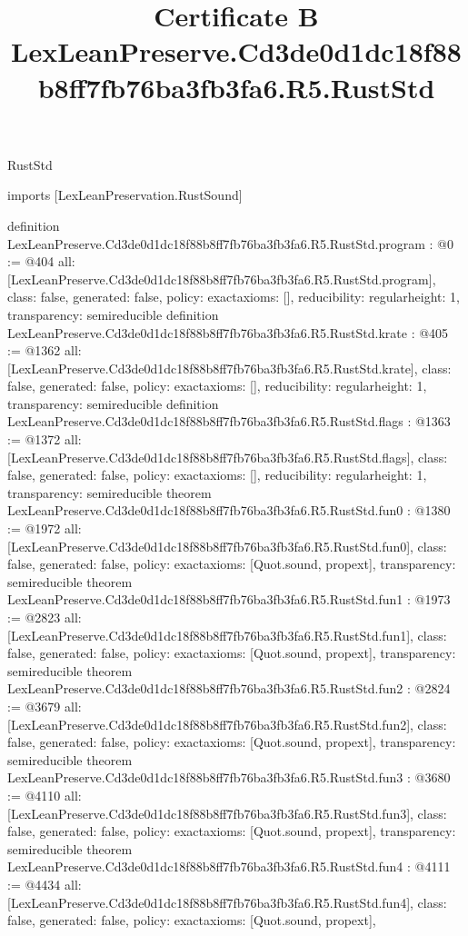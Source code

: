 \begin{lexlean}{RustStd}
\title{Certificate B LexLeanPreserve.Cd3de0d1dc18f88b8ff7fb76ba3fb3fa6.R5.RustStd}
\begin{coremodule}
imports [LexLeanPreservation.RustSound]

definition LexLeanPreserve.Cd3de0d1dc18f88b8ff7fb76ba3fb3fa6.R5.RustStd.program : @0 := @404 {
  all: [LexLeanPreserve.Cd3de0d1dc18f88b8ff7fb76ba3fb3fa6.R5.RustStd.program],
  class: false,
  generated: false,
  policy: exact{axioms: []},
  reducibility: regular{height: 1},
  transparency: semireducible
}
definition LexLeanPreserve.Cd3de0d1dc18f88b8ff7fb76ba3fb3fa6.R5.RustStd.krate : @405 := @1362 {
  all: [LexLeanPreserve.Cd3de0d1dc18f88b8ff7fb76ba3fb3fa6.R5.RustStd.krate],
  class: false,
  generated: false,
  policy: exact{axioms: []},
  reducibility: regular{height: 1},
  transparency: semireducible
}
definition LexLeanPreserve.Cd3de0d1dc18f88b8ff7fb76ba3fb3fa6.R5.RustStd.flags : @1363 := @1372 {
  all: [LexLeanPreserve.Cd3de0d1dc18f88b8ff7fb76ba3fb3fa6.R5.RustStd.flags],
  class: false,
  generated: false,
  policy: exact{axioms: []},
  reducibility: regular{height: 1},
  transparency: semireducible
}
theorem LexLeanPreserve.Cd3de0d1dc18f88b8ff7fb76ba3fb3fa6.R5.RustStd.fun0 : @1380 := @1972 {
  all: [LexLeanPreserve.Cd3de0d1dc18f88b8ff7fb76ba3fb3fa6.R5.RustStd.fun0],
  class: false,
  generated: false,
  policy: exact{axioms: [Quot.sound, propext]},
  transparency: semireducible
}
theorem LexLeanPreserve.Cd3de0d1dc18f88b8ff7fb76ba3fb3fa6.R5.RustStd.fun1 : @1973 := @2823 {
  all: [LexLeanPreserve.Cd3de0d1dc18f88b8ff7fb76ba3fb3fa6.R5.RustStd.fun1],
  class: false,
  generated: false,
  policy: exact{axioms: [Quot.sound, propext]},
  transparency: semireducible
}
theorem LexLeanPreserve.Cd3de0d1dc18f88b8ff7fb76ba3fb3fa6.R5.RustStd.fun2 : @2824 := @3679 {
  all: [LexLeanPreserve.Cd3de0d1dc18f88b8ff7fb76ba3fb3fa6.R5.RustStd.fun2],
  class: false,
  generated: false,
  policy: exact{axioms: [Quot.sound, propext]},
  transparency: semireducible
}
theorem LexLeanPreserve.Cd3de0d1dc18f88b8ff7fb76ba3fb3fa6.R5.RustStd.fun3 : @3680 := @4110 {
  all: [LexLeanPreserve.Cd3de0d1dc18f88b8ff7fb76ba3fb3fa6.R5.RustStd.fun3],
  class: false,
  generated: false,
  policy: exact{axioms: [Quot.sound, propext]},
  transparency: semireducible
}
theorem LexLeanPreserve.Cd3de0d1dc18f88b8ff7fb76ba3fb3fa6.R5.RustStd.fun4 : @4111 := @4434 {
  all: [LexLeanPreserve.Cd3de0d1dc18f88b8ff7fb76ba3fb3fa6.R5.RustStd.fun4],
  class: false,
  generated: false,
  policy: exact{axioms: [Quot.sound, propext]},
}
\end{coremodule}
\end{lexlean}
